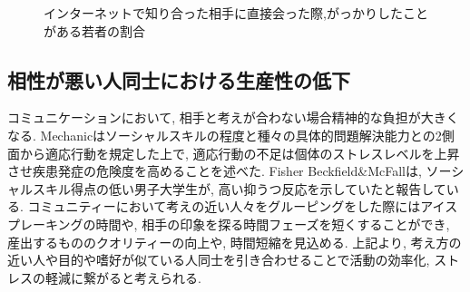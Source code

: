 \begin{figure}[htbp]
    \begin{center}
    \end{center}
    \caption{インターネットで知り合った相手に直接会った際,がっかりしたことがある若者の割合}
    \label{fig:onlinemeeting_to_real}
\end{figure}


\subsection{相性が悪い人同士における生産性の低下}
コミュニケーションにおいて, 相手と考えが合わない場合精神的な負担が大きくなる.
Mechanicはソーシャルスキルの程度と種々の具体的問題解決能力との2側面から適応行動を規定した上で,
適応行動の不足は個体のストレスレベルを上昇させ疾患発症の危険度を高めることを述べた.\cite{Mechanic}
Fisher Beckfield\&McFallは, ソーシャルスキル得点の低い男子大学生が,
高い抑うつ反応を示していたと報告している.\cite{FisherMcFall}
コミュニティーにおいて考えの近い人々をグルーピングをした際にはアイスプレーキングの時間や,
相手の印象を探る時間フェーズを短くすることができ, 産出するもののクオリティーの向上や, 時間短縮を見込める.
上記より, 考え方の近い人や目的や嗜好が似ている人同士を引き合わせることで活動の効率化,
ストレスの軽減に繋がると考えられる.



